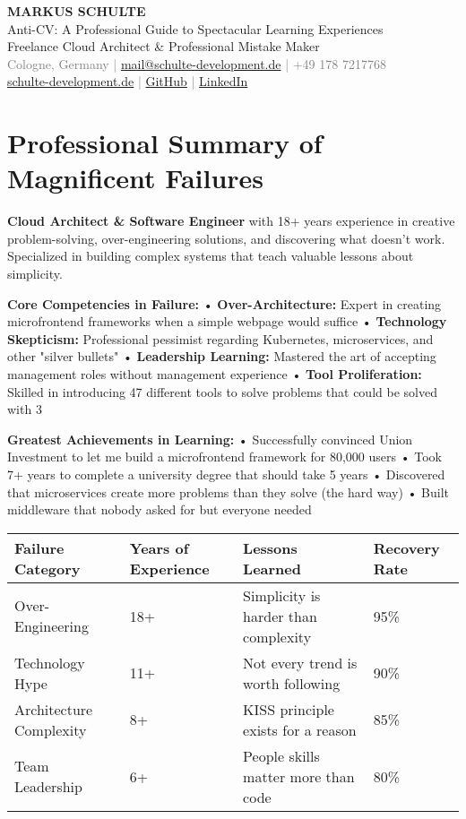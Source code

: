 \documentclass[10pt,a4paper]{article}
\begin{document}
\begin{center}
{\Huge\bfseries\sffamily\color{darkblue} MARKUS SCHULTE}\\[5pt]
{\Large\sffamily Anti-CV: A Professional Guide to Spectacular Learning Experiences}\\[8pt]
{\large\sffamily Freelance Cloud Architect \& Professional Mistake Maker}\\[5pt]
\textcolor{gray}{Cologne, Germany | \href{mailto:mail@schulte-development.de}{mail@schulte-development.de} | +49 178 7217768}\\
\textcolor{gray}{\href{https://schulte-development.de}{schulte-development.de} | \href{https://github.com/SchulteDev}{GitHub} | \href{https://linkedin.com/in/markus-schulte}{LinkedIn}}
\end{center}

\section{Professional Summary of Magnificent Failures}

\textbf{Cloud Architect \& Software Engineer} with 18+ years experience in creative problem-solving, over-engineering solutions, and discovering what doesn't work. Specialized in building complex systems that teach valuable lessons about simplicity.

\textbf{Core Competencies in Failure:}
• \textbf{Over-Architecture:} Expert in creating microfrontend frameworks when a simple webpage would suffice
• \textbf{Technology Skepticism:} Professional pessimist regarding Kubernetes, microservices, and other "silver bullets"
• \textbf{Leadership Learning:} Mastered the art of accepting management roles without management experience
• \textbf{Tool Proliferation:} Skilled in introducing 47 different tools to solve problems that could be solved with 3

\textbf{Greatest Achievements in Learning:}
• Successfully convinced Union Investment to let me build a microfrontend framework for 80,000 users
• Took 7+ years to complete a university degree that should take 5 years
• Discovered that microservices create more problems than they solve (the hard way)
• Built middleware that nobody asked for but everyone needed

\begin{center}
\begin{tabularx}{\textwidth}{|X|X|X|X|}
\hline
\textbf{Failure Category} & \textbf{Years of Experience} & \textbf{Lessons Learned} & \textbf{Recovery Rate} \\
\hline
Over-Engineering & 18+ & Simplicity is harder than complexity & 95\% \\
\hline
Technology Hype & 11+ & Not every trend is worth following & 90\% \\
\hline
Architecture Complexity & 8+ & KISS principle exists for a reason & 85\% \\
\hline
Team Leadership & 6+ & People skills matter more than code & 80\% \\
\hline
\end{tabularx}
\end{center}
\end{document}
